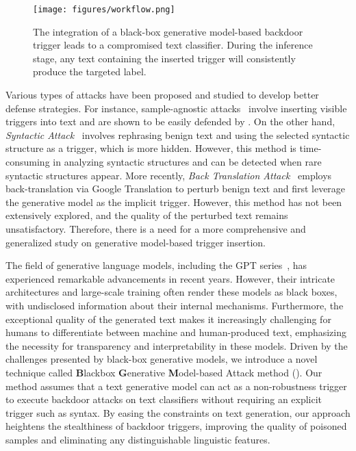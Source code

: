 \begin{figure}[t]
    \centering 
\texttt{[image: figures/workflow.png]}
  \caption{The integration of a black-box generative model-based backdoor trigger leads to a compromised text classifier. During the inference stage, any text containing the inserted trigger will consistently produce the targeted label.}
\label{fig:workflow}
\end{figure}
Various types of attacks have been proposed and studied to develop better defense strategies. For instance, sample-agnostic attacks~\cite{chen2021badnl, 8836465} involve inserting visible triggers into text and are shown to be easily defended by \citet{qi2020onion, li2021bfclass, yang2021rap}. On the other hand, \emph{Syntactic Attack}~\cite{qi2021hidden} involves rephrasing benign text and using the selected syntactic structure as a trigger, which is more hidden. However, this method is time-consuming in analyzing syntactic structures and can be detected when rare syntactic structures appear. More recently, \emph{Back Translation Attack}~\cite{chen2022kallima} employs back-translation via Google Translation to perturb benign text and first leverage the generative model as the implicit trigger. However, this method has not been extensively explored, and the quality of the perturbed text remains unsatisfactory. Therefore, there is a need for a more comprehensive and generalized study on generative model-based trigger insertion.

The field of generative language models, including the GPT series~\cite{brown2020language, ouyang2022training, openai2023gpt4}, has experienced remarkable advancements in recent years. However, their intricate architectures and large-scale training often render these models as black boxes, with undisclosed information about their internal mechanisms. Furthermore, the exceptional quality of the generated text makes it increasingly challenging for humans to differentiate between machine and human-produced text, emphasizing the necessity for transparency and interpretability in these models. Driven by the challenges presented by black-box generative models, we introduce a novel technique called \textbf{B}lackbox \textbf{G}enerative \textbf{M}odel-based Attack method (\method). Our method assumes that a text generative model can act as a non-robustness trigger to execute backdoor attacks on text classifiers without requiring an explicit trigger such as syntax. By easing the constraints on text generation, our approach heightens the stealthiness of backdoor triggers, improving the quality of poisoned samples and eliminating any distinguishable linguistic features.

